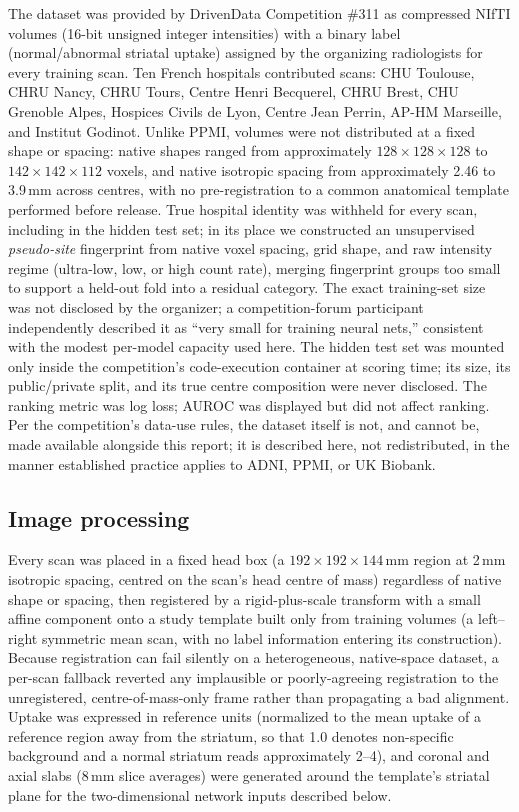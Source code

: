 \documentclass[11pt]{article}
\begin{document}
The dataset was provided by DrivenData Competition \#311 as compressed NIfTI volumes (16-bit unsigned integer intensities) with a binary label (normal/abnormal striatal uptake) assigned by the organizing radiologists for every training scan. Ten French hospitals contributed scans: CHU Toulouse, CHRU Nancy, CHRU Tours, Centre Henri Becquerel, CHRU Brest, CHU Grenoble Alpes, Hospices Civils de Lyon, Centre Jean Perrin, AP-HM Marseille, and Institut Godinot. Unlike PPMI, volumes were not distributed at a fixed shape or spacing: native shapes ranged from approximately $128\times128\times128$ to $142\times142\times112$ voxels, and native isotropic spacing from approximately 2.46 to 3.9\,mm across centres, with no pre-registration to a common anatomical template performed before release. True hospital identity was withheld for every scan, including in the hidden test set; in its place we constructed an unsupervised \emph{pseudo-site} fingerprint from native voxel spacing, grid shape, and raw intensity regime (ultra-low, low, or high count rate), merging fingerprint groups too small to support a held-out fold into a residual category. The exact training-set size was not disclosed by the organizer; a competition-forum participant independently described it as ``very small for training neural nets,'' consistent with the modest per-model capacity used here. The hidden test set was mounted only inside the competition's code-execution container at scoring time; its size, its public/private split, and its true centre composition were never disclosed. The ranking metric was log loss; AUROC was displayed but did not affect ranking. Per the competition's data-use rules, the dataset itself is not, and cannot be, made available alongside this report; it is described here, not redistributed, in the manner established practice applies to ADNI, PPMI, or UK Biobank.

\subsection*{Image processing}

Every scan was placed in a fixed head box (a $192\times192\times144$\,mm region at 2\,mm isotropic spacing, centred on the scan's head centre of mass) regardless of native shape or spacing, then registered by a rigid-plus-scale transform with a small affine component onto a study template built only from training volumes (a left--right symmetric mean scan, with no label information entering its construction). Because registration can fail silently on a heterogeneous, native-space dataset, a per-scan fallback reverted any implausible or poorly-agreeing registration to the unregistered, centre-of-mass-only frame rather than propagating a bad alignment. Uptake was expressed in reference units (normalized to the mean uptake of a reference region away from the striatum, so that 1.0 denotes non-specific background and a normal striatum reads approximately 2--4), and coronal and axial slabs (8\,mm slice averages) were generated around the template's striatal plane for the two-dimensional network inputs described below.
\end{document}
